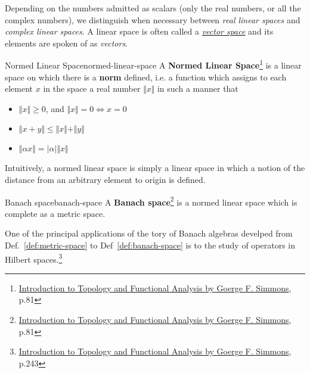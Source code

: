Depending on the numbers admitted as scalars (only the real numbers, or all the complex numbers), we distinguish when
necessary between \textit{real linear spaces} and \textit{complex linear spaces}. A linear space is often called a
\hyperlink{vector-space}{\textit{vector space}} and its elements are spoken of as \textit{vectors}.

\begin{Definition}{Normed Linear Space}{normed-linear-space}
    A \textbf{Normed Linear Space}\footnote{\href{https://trello.com/c/3EPccNTa}{Introduction to Topology and Functional Analysis by Goerge F. Simmons}, p.81}
    is a linear space on which there is a \textbf{norm} defined, i.e. a function which assigns to each element $x$ in
    the space a real number $\Vert x \Vert$ in such a manner that

    \begin{itemize}
        \item $\Vert x \Vert \ge 0$, and $\Vert x \Vert = 0 \iff x = 0$
        \item $\Vert x + y \Vert \le \Vert x \Vert + \Vert y \Vert$
        \item $\Vert \alpha x \Vert = \vert \alpha \vert \Vert x \Vert$
    \end{itemize}
\end{Definition}

Intuitively, a normed linear space is simply a linear space in which a notion of the distance from an arbitrary element
to origin is defined.

\begin{Definition}{Banach space}{banach-space}
    A \textbf{Banach space}\footnote{\href{https://trello.com/c/3EPccNTa}{Introduction to Topology and Functional Analysis by Goerge F. Simmons}, p.81}
    is a normed linear space which is complete as a metric space.
\end{Definition}

One of the principal applications of the tory of Banach algebras develped from Def.~\ref{def:metric-space} to
Def~\ref{def:banach-space} is to the study of operators in Hilbert
spaces.\footnote{\href{https://trello.com/c/3EPccNTa}{Introduction to Topology and Functional Analysis by Goerge F. Simmons}, p.243}

